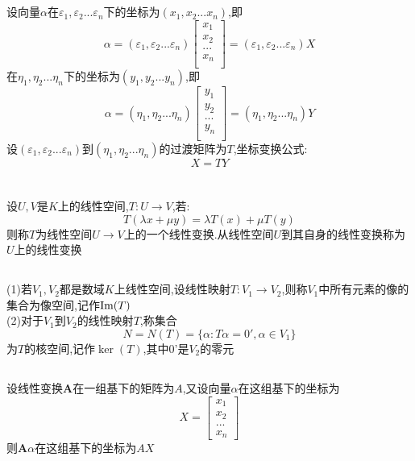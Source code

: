 \documentclass[11pt, a4paper, UTF8]{ctexart}
\begin{document}
\section{}
设向量$\alpha$在$\varepsilon_1,\varepsilon_2...\varepsilon_n$下的坐标为$(x_1,x_2...x_n)$,即
\[\alpha=(\varepsilon_1,\varepsilon_2...\varepsilon_n)\begin{bmatrix}
x_1\\
x_2\\
...\\
x_n\\
\end{bmatrix}=(\varepsilon_1,\varepsilon_2...\varepsilon_n)X\]
在$\eta_1,\eta_2...\eta_n$下的坐标为$(y_1,y_2...y_n)$,即\\
\[\alpha=(\eta_1,\eta_2...\eta_n)\begin{bmatrix}
y_1\\
y_2\\
...\\
y_n\\
\end{bmatrix}=(\eta_1,\eta_2...\eta_n)Y\]
设$(\varepsilon_1,\varepsilon_2...\varepsilon_n)$到$(\eta_1,\eta_2...\eta_n)$的过渡矩阵为$T$,坐标变换公式:
\[X=TY\]
\section{}
\subsection{}
设$U,V$是$K$上的线性空间,$T:U\to V$,若:\\
\[T(\lambda x+\mu y)=\lambda T(x)+\mu T(y)\]
则称$T$为线性空间$U\to V$上的一个线性变换.从线性空间$U$到其自身的线性变换称为$U$上的线性变换\\
\subsection{}
(1)若$V_1,V_2$都是数域$K$上线性空间,设线性映射$T:V_1\to V_2$,则称$V_1$中所有元素的像的集合为像空间,记作$\mbox{Im}(T)$\\
(2)对于$V_1$到$V_2$的线性映射$T$,称集合
\[N=N(T)=\{\alpha:T\alpha=0',\alpha\in V_1\}\]
为$T$的核空间,记作$\ker(T)$,其中0'是$V_2$的零元\\
\subsection{}
设线性变换$\bm A$在一组基下的矩阵为$A$,又设向量$\alpha$在这组基下的坐标为
\[X=\begin{bmatrix}
x_1\\
x_2\\
...\\
x_n
\end{bmatrix}\]
则$\bm A\alpha$在这组基下的坐标为$AX$
\end{document}
